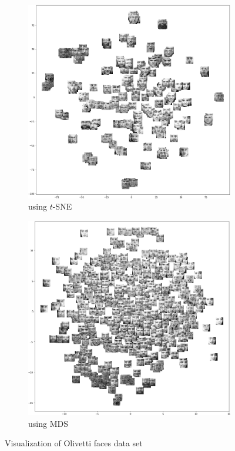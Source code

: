 \begin{figure}
	\centering
	\begin{subfigure}[h]{0.65\textwidth}
		\centering
		\includegraphics[width=\textwidth]{./figures/tsne_1.png}
		\caption{using $t$-SNE}
	\end{subfigure}
	
	\begin{subfigure}[h]{0.65\textwidth}
		\centering
		\includegraphics[width=\textwidth]{./figures/mds_1.png}
		\caption{using MDS}
	\end{subfigure}
	\caption{Visualization of Olivetti faces data set}
\end{figure}

